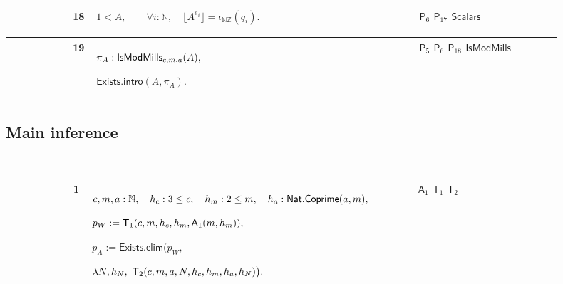 \documentclass[12pt,reqno]{amsart}
\theoremstyle{blueplain}
\numberwithin{equation}{section}
\begin{document}
{\scriptsize \setlength{\parskip}{0pt}\nointerlineskip
\noindent 
\begin{tabular}{|@{}>{\centering\arraybackslash}m{0.10658\linewidth}|>{\centering\arraybackslash}m{0.03553\linewidth}|>{\centering\arraybackslash}m{0.52105\linewidth}|>{\centering\arraybackslash}m{0.23684\linewidth}|}
\hline
{\hypertarget{row:P18}{$\mathsf{P}$}} & {18} & {$\displaystyle %
1<A,\qquad\forall i:\mathbb{N},\quad\lfloor A^{e_i}\rfloor=\iota_{\mathbb{N}%
\mathbb{Z}}(q_i).$} & {\hyperlink{row:P6}{$\mathsf{P}_{6}$} \hyperlink{row:P17}%
{$\mathsf{P}_{17}$} \hyperlink{def:Scalars}{$\mathsf{Scalars}$}} \\ \hline
\end{tabular}%
}

{\scriptsize \setlength{\parskip}{0pt}\nointerlineskip
\noindent 
\begin{tabular}{|@{}>{\centering\arraybackslash}m{0.10658\linewidth}|>{\centering\arraybackslash}m{0.03553\linewidth}|>{\centering\arraybackslash}m{0.52105\linewidth}|>{\centering\arraybackslash}m{0.23684\linewidth}|}
\hline
{\hypertarget{row:P19}{$\mathsf{P}$}} & {19} & {$\displaystyle \pi_A: 
\hyperlink{def:IsModMills}{\mathsf{IsModMills} }_{c,m,a}(A),$ \par$%
\displaystyle \mathsf{Exists.intro}(A,\pi_A).$} & {\hyperlink{row:P5}{$%
\mathsf{P}_{5}$} \hyperlink{row:P6}{$\mathsf{P}_{6}$} \hyperlink{row:P18}{$%
\mathsf{P}_{18}$} \hyperlink{def:IsModMills}{$\mathsf{IsModMills}$}} \\ 
\hline
\end{tabular}%
}

\subsection{Main inference}

\label{sec:main-inference} {\ {\scriptsize \setlength{\parskip}{0pt}
\noindent 
\begin{tabular}{|@{}>{\centering\arraybackslash}m{0.10658\linewidth}|>{\centering\arraybackslash}m{0.03553\linewidth}|>{\centering\arraybackslash}m{0.52105\linewidth}|>{\centering\arraybackslash}m{0.23684\linewidth}|}
\hline
{\hypertarget{row:M1}{$\mathsf{M}$}} & {1} & {$\displaystyle c,m,a:\mathbb{N}%
,\quad h_c:3\le c,\quad h_m:2\le m,\quad h_a:\hyperlink{def:Nat.Coprime}{%
\mathsf{Nat.Coprime} }(a,m),$ \par$\displaystyle p_W:=\hyperlink{row:T1}{%
\mathsf{T}_{1} }(c,m,h_c,h_m,\hyperlink{row:A1}{\mathsf{A}_{1} }(m,h_m)),$ %
\par$\displaystyle p_A:=\mathsf{Exists.elim}\bigl(p_W,$ \par$\displaystyle %
\lambda N,h_N,\ \hyperlink{row:T2}{\mathsf{T}_{2} }(c,m,a,N,h_c,h_m,h_a,h_N)%
\bigr).$} & {\hyperlink{row:A1}{$\mathsf{A}_{1}$} \hyperlink{row:T1}{$%
\mathsf{T}_{1}$} \hyperlink{row:T2}{$\mathsf{T}_{2}$}} \\ \hline
\end{tabular}%
}}
\end{document}
